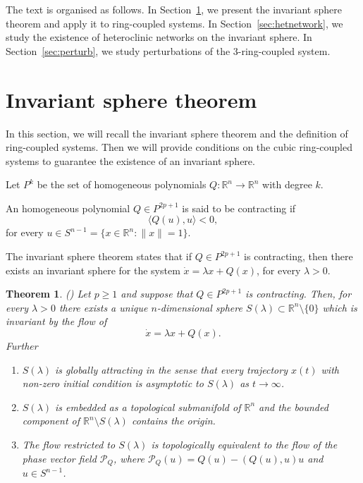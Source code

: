 \documentclass{article}
\newtheorem{theo}{Theorem}
\theoremstyle{definition}
\newenvironment{defi}
  {\pushQED{\qed}\renewcommand{\qedsymbol}{$\lozenge$}\defix}
  {\popQED\enddefix}
\begin{document}
The text is organised as follows. In Section~\ref{sec:inv_sphere}, we present the invariant sphere theorem and apply it to ring-coupled systems. In Section~\ref{sec:hetnetwork}, we study the existence of heteroclinic networks on the invariant sphere. In Section~\ref{sec:perturb}, we study perturbations of the $3$-ring-coupled system.

\section{Invariant sphere theorem}\label{sec:inv_sphere}

In this section, we will recall the invariant sphere theorem and the definition of ring-coupled systems. Then we will provide conditions on the cubic ring-coupled systems to guarantee the existence of an invariant sphere.

Let $P^{k}$ be the set of homogeneous polynomials $Q:\mathbb{R}^n\rightarrow \mathbb{R}^n$  with degree $k$.

\begin{defi}
An homogeneous polynomial $Q\in P^{2p+1}$ is said to be contracting if 
$$\langle Q(u),u\rangle<0,$$
for every $u\in S^{n-1}=\{x\in \mathbb{R}^n: \|x\|=1\}$.
\end{defi}

The invariant sphere theorem states that if $Q\in P^{2p+1}$ is contracting, then there exists an invariant sphere for the system $\dot{x}=\lambda x + Q(x)$, for every $\lambda>0$.


\begin{theo}(\cite[Theorem~5.1.1]{F07})
Let $p\geq 1$ and suppose that $Q\in P^{2p+1}$ is contracting. Then, for every $\lambda>0$ there exists a unique $n$-dimensional sphere $S(\lambda)\subset \mathbb{R}^n\setminus \{0\}$ which is invariant by the flow of 
$$\dot{x}=\lambda x + Q(x).$$
Further
\begin{enumerate}
	\item $S(\lambda)$ is globally attracting in the sense that every trajectory $x(t)$ with non-zero initial condition is asymptotic to $S(\lambda)$ as $t\rightarrow \infty$.
\item $S(\lambda)$ is embedded as a topological submanifold of $\mathbb{R}^n$ and the bounded component of $\mathbb{R}^n\setminus S(\lambda)$ contains the origin.
\item The flow restricted to $S(\lambda)$ is topologically equivalent to the flow of the phase vector field $\mathcal{P}_Q$, where $\mathcal{P}_Q(u)= Q(u)-(Q(u),u)u$ and $u\in S^{n-1}$.
\end{enumerate}
\end{theo}
\end{document}
